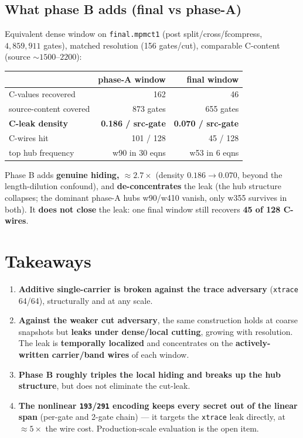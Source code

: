 \documentclass[11pt]{article}
\newcommand{\code}[1]{\texttt{#1}}
\begin{document}
\subsection{What phase B adds (final vs phase-A)}

Equivalent dense window on \code{final.mpmct1} (post split/cross/fcompress,
$4{,}859{,}911$ gates), matched resolution (156 gates/cut), comparable C-content
(source $\sim\!1500$--$2200$):

\begin{center}
\begin{tabular}{l r r}
\toprule
 & phase-A window & final window \\
\midrule
C-values recovered      & 162 & 46 \\
source-content covered  & 873 gates & 655 gates \\
\textbf{C-leak density} & \textbf{0.186 / src-gate} & \textbf{0.070 / src-gate} \\
C-wires hit             & 101 / 128 & 45 / 128 \\
top hub frequency       & w90 in 30 eqns & w53 in 6 eqns \\
\bottomrule
\end{tabular}
\end{center}

Phase B adds \textbf{genuine hiding, $\approx 2.7\times$} (density $0.186\to 0.070$,
beyond the length-dilution confound), and \textbf{de-concentrates} the leak (the hub
structure collapses; the dominant phase-A hubs w90/w410 vanish, only w355 survives in
both). It \textbf{does not close} the leak: one final window still recovers
\textbf{45 of 128 C-wires}.

\section{Takeaways}
\begin{enumerate}
\item \textbf{Additive single-carrier is broken against the trace adversary}
(\code{xtrace} 64/64), structurally and at any scale.
\item \textbf{Against the weaker cut adversary}, the same construction holds at coarse
snapshots but \textbf{leaks under dense/local cutting}, growing with resolution. The
leak is \textbf{temporally localized} and concentrates on the \textbf{actively-written
carrier/band wires} of each window.
\item \textbf{Phase B roughly triples the local hiding and breaks up the hub
structure}, but does not eliminate the cut-leak.
\item \textbf{The nonlinear \code{193}/\code{291} encoding keeps every secret out of
the linear span} (per-gate and 2-gate chain) --- it targets the \code{xtrace} leak
directly, at $\approx 5\times$ the wire cost. Production-scale evaluation is the open
item.
\end{enumerate}
\end{document}
